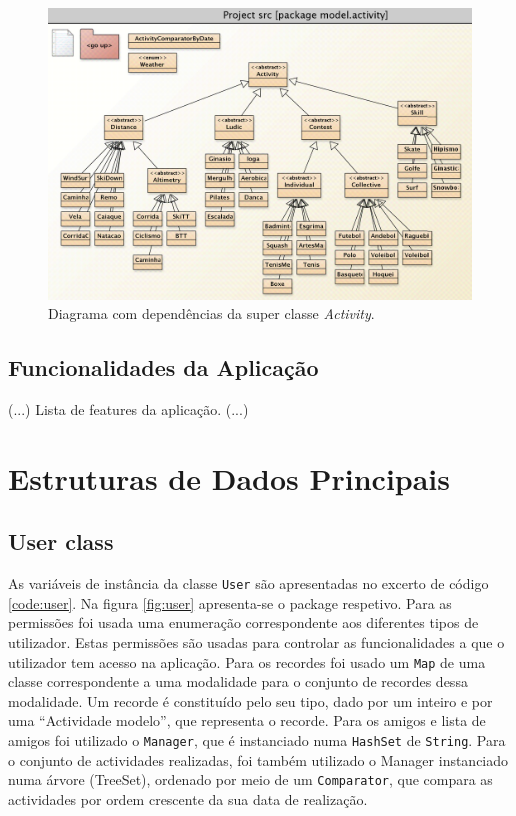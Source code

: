 \documentclass[a4paper,10pt]{report}
\begin{document}
\begin{figure}
\centering
\includegraphics[width=\textwidth]{diagramaActivities.png}
\caption{Diagrama com dependências da super classe \emph{Activity}.}
\label{fig:activityDiagram}
\end{figure}

\section{Funcionalidades da Aplicação}
\label{sec:funcionalidades}
(...)
Lista de features da aplicação.
(...)

\chapter{Estruturas de Dados Principais}
\label{cap:estruturas}
\section{User class}
\label{sec:user}
As variáveis de instância da classe \verb!User! são apresentadas no excerto de código \ref{code:user}.
Na figura \ref{fig:user} apresenta-se o package respetivo.
Para as permissões foi usada uma enumeração correspondente aos diferentes tipos de utilizador. 
Estas permissões são usadas para controlar as funcionalidades a que o utilizador tem acesso na aplicação.
Para os recordes foi usado um \verb!Map! de uma classe correspondente a uma modalidade para o conjunto de recordes dessa modalidade. 
Um recorde é constituído pelo seu tipo, dado por um inteiro e por uma ``Actividade modelo'', que representa o recorde.
Para os amigos e lista de amigos foi utilizado o \verb!Manager!, que é instanciado numa \verb!HashSet! de \verb!String!.
Para o conjunto de actividades realizadas, foi também utilizado o Manager instanciado numa árvore (TreeSet), ordenado por meio 
de um \verb!Comparator!, que compara as actividades por ordem crescente da sua data de realização.
\end{document}
